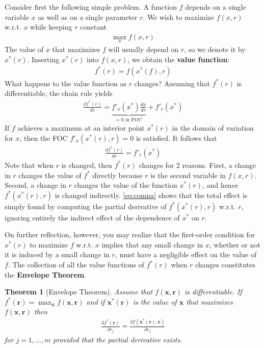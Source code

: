 \documentclass[10pt,a4paper]{book}
\newtheorem{theorem}{Theorem}[section]
\theoremstyle{definition}\newtheorem{definition}{Definition}
\theoremstyle{definition}\newtheorem{fact}{Fact}
\theoremstyle{definition}\newtheorem{ex}{Ex.}
\theoremstyle{definition}\newtheorem{project}{Project}
\theoremstyle{definition}\newtheorem{problem}{Problem}
\theoremstyle{definition}\newtheorem{example}{Example}
\numberwithin{theorem}{chapter}
\numberwithin{corollary}{chapter}
\numberwithin{assumption}{chapter}
\numberwithin{definition}{chapter}
\numberwithin{prop}{chapter}
\numberwithin{notation}{chapter}
\numberwithin{problem}{chapter}
\numberwithin{example}{chapter}
\numberwithin{fact}{chapter}
\numberwithin{ex}{chapter}
\newenvironment{ftheorem}
{\begin{mdframed}\begin{theorem}}
		{\end{theorem}\end{mdframed}}
\def\r{\mathbf r}
\def\x{\mathbf x}
\begin{document}
	Consider first the following simple problem. A function $f$ depends on a single variable $x$ as well as on a single parameter $r$. We wish to maximize $f (x, r)$ w.r.t. $x$ while keeping $r$ constant
	\begin{align*}
		\max_x f(x,r) 
	\end{align*}
	The value of $x$ that maximizes $f$ will usually depend on $r$, so we denote it by $x^*(r)$. Inserting $x^*(r)$ into $f (x, r)$, we obtain the \textbf{value function}:
	\begin{align*}
		f^*(r) = f (x^*(f), r) 
	\end{align*}
	What happens to the value function as $r$ changes? Assuming that $f^*(r)$ is differentiable, the
	chain rule yields
	\begin{align}
		\frac{d f^*(r)}{d r} = \underbrace{f'_x (x^*) \frac{d x}{d r}}_{=0 \text{ in FOC }}  + f'_r (x^*) 
	\end{align}
	If $f$ achieves a maximum at an interior point $x^*(r)$ in the domain of variation for $x$, then the FOC $f'_x (x^*(r), r) = 0$ is satisfied. It follows that
	\begin{align}
		\frac{d f^*(r)}{d r} =  f'_r (x^*)  \label{eq:compa} 
	\end{align}
	Note that when $r$ is changed, then $f^*(r)$ changes for 2 reasons. First, a change in $r$ changes the value of $f^*$ directly because $r$ is the second variable in $f (x, r)$. Second, a change in $r$ changes the value of the function $x^*(r)$, and hence $f^*(x^*(r), r)$ is changed indirectly. \eqref{eq:compa} shows that the total effect is simply found by computing the partial derivative of $f^*(x^*(r), r)$ w.r.t. $r$, ignoring entirely the indirect effect of the dependence of $x^*$ on $r$. 
	
	On further reflection, however, you may realize that the first-order condition for $x^*(r)$ to maximize $f$ w.r.t. $x$ implies that any small change in $x$, whether or not it is induced by a small change in $r$, must have a negligible effect on the value of $f$. The collection of all the value functions of $f^*(r)$ when $r$ changes constitutes the \textbf{Envelope Theorem}.
	
	\begin{ftheorem}[Envelope Theorem]
		Assume that $f(\x,\r)$ is differentiable. If $f^*(\r) = \max_{\x} f(\x,\r)$ and if $\x^*(\r)$ is the value of $\x$ that maximizes $f(\x, \r)$ then
		\begin{align*}
			\frac{\partial f^*(\r)}{\partial r_j} = \frac{\partial f (\x^*(\r), \r) }{\partial r_j} 
		\end{align*}
		for $j=1,\dots,m$ provided that the partial derivative exists.
	\end{ftheorem}
	
\end{document}
